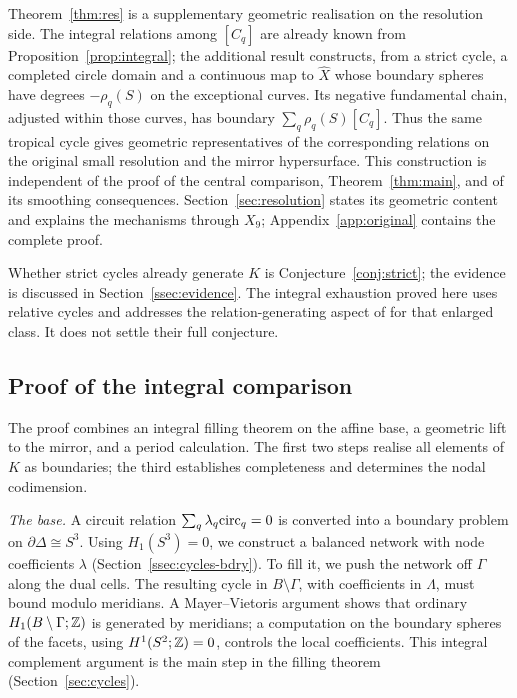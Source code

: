 Theorem~\ref{thm:res} is a supplementary geometric realisation on the resolution side. The integral relations among
$[C_q]$ are already known from Proposition~\ref{prop:integral}; the additional result constructs, from a strict cycle,
a completed circle domain and a continuous map to $\widehat X$ whose boundary spheres have degrees $-\rho_q(S)$ on
the exceptional curves. Its negative fundamental chain, adjusted within those curves, has boundary
$\sum_q\rho_q(S)[C_q]$. Thus the same tropical cycle gives geometric representatives of the corresponding relations
on the original small resolution and the mirror hypersurface. This construction is independent of the proof of the
central comparison, Theorem~\ref{thm:main}, and of its smoothing consequences. Section~\ref{sec:resolution} states
its geometric content and explains the mechanisms through $X_9$; Appendix~\ref{app:original} contains the complete proof.

Whether strict cycles already generate $K$ is Conjecture~\ref{conj:strict}; the evidence is discussed in
Section~\ref{ssec:evidence}. The integral exhaustion proved here uses relative cycles and addresses the
relation-generating aspect of \cite[Conj.~8.3]{CBM} for that enlarged class. It does not settle their full conjecture.

\subsection{Proof of the integral comparison}
The proof combines an integral filling theorem on the affine base, a geometric lift to the mirror, and a period
calculation. The first two steps realise all elements of $K$ as boundaries; the third establishes completeness and
determines the nodal codimension.

\emph{The base.} A circuit relation $\sum_q\lambda_q\mathrm{circ}_q=0$ is converted into a boundary problem on
$\partial\Delta\cong S^3$. Using $H_1(S^3)=0$, we construct a balanced network with node coefficients $\lambda$
(Section~\ref{ssec:cycles-bdry}). To fill it, we push the network off $\Gamma$ along the dual cells. The resulting
cycle in $B\setminus\Gamma$, with coefficients in $\Lambda$, must bound modulo meridians. A Mayer--Vietoris argument
shows that ordinary $H_1(B\setminus\Gamma;\mathbb Z)$ is generated by meridians; a computation on the boundary spheres of
the facets, using $H^1(S^2;\mathbb Z)=0$, controls the local coefficients. This integral complement argument is the main
step in the filling theorem (Section~\ref{sec:cycles}).

